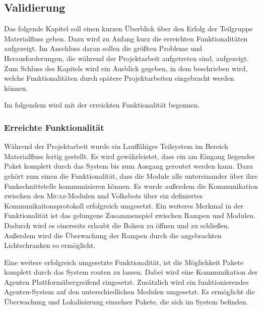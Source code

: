 \subsection{Validierung}
Das folgende Kapitel soll einen kurzen Überblick über den Erfolg der Teilgruppe Materialfluss geben. Dazu wird zu Anfang kurz die erreichten Funktionalitäten aufgezeigt. Im Anschluss daran sollen die größten Probleme und Herausforderungen, die während der Projektarbeit aufgetreten sind, aufgezeigt. Zum Schluss des Kapitels wird ein Ausblick gegeben, in dem beschrieben wird, welche Funktionalitäten durch spätere Projektarbeiten eingebracht werden können.

Im folgendem wird mit der erreichten Funktionalität begonnen.

\subsubsection{Erreichte Funktionalität}
Während der Projektarbeit wurde ein Lauffähiges Teilsystem im Bereich Materialfluss fertig gestellt. Es wird gewährleistet, dass ein am Eingang liegendes Paket komplett durch das System bis zum Ausgang geroutet werden kann. Dazu gehört zum einen die Funktionalität, dass die Module alle untereinander über ihre Funkschnittstelle kommunizieren können. Es wurde außerdem die Kommunikation zwischen den \textsc{Mica}z-Modulen und Volksbots über ein definiertes Kommunikaitonsprotokoll erfolgreich umgesetzt. Ein weiteres Merkmal in der Funktionalität ist das gelungene Zusammenspiel zwischen Rampen und Modulen. Dadurch wird es einerseits erlaubt die Bolzen zu öffnen und zu schließen. Außerdem wird die Überwachung der Rampen durch die angebrachten Lichtschranken so ermöglicht.

Eine weitere erfolgreich umgesetzte Funktionalität, ist die Möglichkeit Pakete komplett durch das System routen zu lassen. Dabei wird eine Kommunikation der Agenten Plattformübergreifend eingesetzt. Zusätzlich wird ein funktionierendes Agenten-System auf den unterschiedlichen Modulen umgesetzt. Es ermöglicht die Überwachung und Lokalisierung einzelner Pakete, die sich im System befinden.

